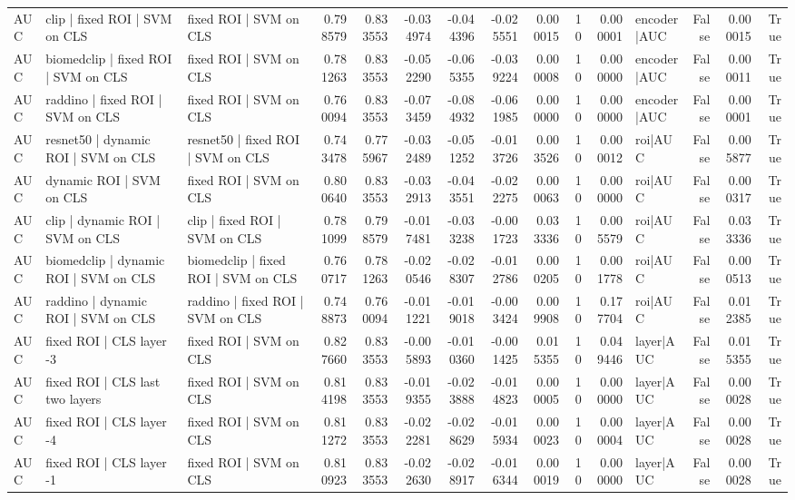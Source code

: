 \begin{table}
\begin{tabular}{lllrrrrrrrrlrrr}
AUC & clip | fixed ROI | SVM on CLS & fixed ROI | SVM on CLS & 0.798579 & 0.833553 & -0.034974 & -0.044396 & -0.025551 & 0.000015 & 10 & 0.000001 & encoder|AUC & False & 0.000015 & True \\
AUC & biomedclip | fixed ROI | SVM on CLS & fixed ROI | SVM on CLS & 0.781263 & 0.833553 & -0.052290 & -0.065355 & -0.039224 & 0.000008 & 10 & 0.000000 & encoder|AUC & False & 0.000011 & True \\
AUC & raddino | fixed ROI | SVM on CLS & fixed ROI | SVM on CLS & 0.760094 & 0.833553 & -0.073459 & -0.084932 & -0.061985 & 0.000000 & 10 & 0.000000 & encoder|AUC & False & 0.000001 & True \\
AUC & resnet50 | dynamic ROI | SVM on CLS & resnet50 | fixed ROI | SVM on CLS & 0.743478 & 0.775967 & -0.032489 & -0.051252 & -0.013726 & 0.003526 & 10 & 0.000012 & roi|AUC & False & 0.005877 & True \\
AUC & dynamic ROI | SVM on CLS & fixed ROI | SVM on CLS & 0.800640 & 0.833553 & -0.032913 & -0.043551 & -0.022275 & 0.000063 & 10 & 0.000000 & roi|AUC & False & 0.000317 & True \\
AUC & clip | dynamic ROI | SVM on CLS & clip | fixed ROI | SVM on CLS & 0.781099 & 0.798579 & -0.017481 & -0.033238 & -0.001723 & 0.033336 & 10 & 0.005579 & roi|AUC & False & 0.033336 & True \\
AUC & biomedclip | dynamic ROI | SVM on CLS & biomedclip | fixed ROI | SVM on CLS & 0.760717 & 0.781263 & -0.020546 & -0.028307 & -0.012786 & 0.000205 & 10 & 0.001778 & roi|AUC & False & 0.000513 & True \\
AUC & raddino | dynamic ROI | SVM on CLS & raddino | fixed ROI | SVM on CLS & 0.748873 & 0.760094 & -0.011221 & -0.019018 & -0.003424 & 0.009908 & 10 & 0.177704 & roi|AUC & False & 0.012385 & True \\
AUC & fixed ROI | CLS layer -3 & fixed ROI | SVM on CLS & 0.827660 & 0.833553 & -0.005893 & -0.010360 & -0.001425 & 0.015355 & 10 & 0.049446 & layer|AUC & False & 0.015355 & True \\
AUC & fixed ROI | CLS last two layers & fixed ROI | SVM on CLS & 0.814198 & 0.833553 & -0.019355 & -0.023888 & -0.014823 & 0.000005 & 10 & 0.000000 & layer|AUC & False & 0.000028 & True \\
AUC & fixed ROI | CLS layer -4 & fixed ROI | SVM on CLS & 0.811272 & 0.833553 & -0.022281 & -0.028629 & -0.015934 & 0.000023 & 10 & 0.000004 & layer|AUC & False & 0.000028 & True \\
AUC & fixed ROI | CLS layer -1 & fixed ROI | SVM on CLS & 0.810923 & 0.833553 & -0.022630 & -0.028917 & -0.016344 & 0.000019 & 10 & 0.000000 & layer|AUC & False & 0.000028 & True \\

\end{tabular}
\end{table}

